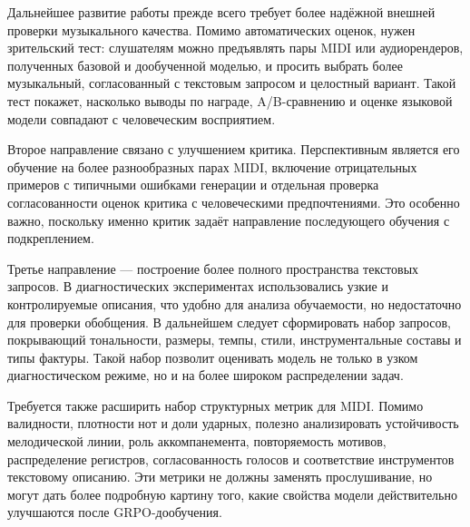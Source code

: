 \documentclass[a4paper,12pt]{extarticle}
\begin{document}
Дальнейшее развитие работы прежде всего требует более надёжной внешней
проверки музыкального качества. Помимо автоматических оценок, нужен
зрительский тест: слушателям можно предъявлять пары MIDI или аудиорендеров,
полученных базовой и дообученной моделью, и просить выбрать более музыкальный,
согласованный с текстовым запросом и целостный вариант. Такой тест покажет,
насколько выводы по награде, A/B-сравнению и оценке языковой модели совпадают
с человеческим восприятием.

Второе направление связано с улучшением критика. Перспективным является его
обучение на более разнообразных парах MIDI, включение отрицательных примеров с
типичными ошибками генерации и отдельная проверка согласованности оценок
критика с человеческими предпочтениями. Это особенно важно, поскольку именно
критик задаёт направление последующего обучения с подкреплением.

Третье направление --- построение более полного пространства текстовых
запросов. В диагностических экспериментах использовались узкие и
контролируемые описания, что удобно для анализа обучаемости, но недостаточно
для проверки обобщения. В дальнейшем следует сформировать набор запросов,
покрывающий тональности, размеры, темпы, стили, инструментальные составы и
типы фактуры. Такой набор позволит оценивать модель не только в узком
диагностическом режиме, но и на более широком распределении задач.

Требуется также расширить набор структурных метрик для MIDI. Помимо
валидности, плотности нот и доли ударных, полезно анализировать устойчивость
мелодической линии, роль аккомпанемента, повторяемость мотивов, распределение
регистров, согласованность голосов и соответствие инструментов текстовому
описанию. Эти метрики не должны заменять прослушивание, но могут дать более
подробную картину того, какие свойства модели действительно улучшаются после
GRPO-дообучения.

\newpage 
\printbibliography[heading=bibintoc] 
\end{document}
